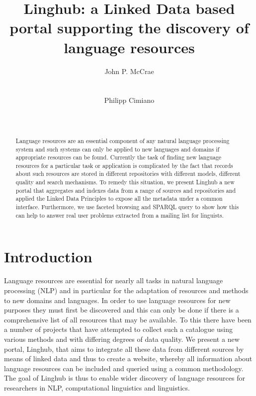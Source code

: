 \documentclass{acm_proc_article-sp}
\begin{document}
\title{Linghub: a Linked Data based portal supporting the discovery of language
resources}

\author{
\alignauthor
John P. McCrae\\
       \\
       \\
\alignauthor
Philipp Cimiano\\
       \\
       \\
   }

\maketitle
\begin{abstract}
    Language resources are an essential component of any natural language
    processing system and such systems can only be applied to new languages and
    domains if appropriate resources can be found. Currently the task of finding
    new language resources for a particular task or application is complicated by the fact that records about such
    resources are
    stored in different repositories with different models, different quality
    and search mechanisms. To remedy this situation, we present Linghub a new
    portal that aggregates and indexes data
    from a range of sources and repositories and applied the Linked Data
    Principles to expose all the metadata under a
    common interface. Furthermore, we use faceted browsing and SPARQL query to
    show how this can help to answer real user problems extracted from a mailing
    list for linguists.
\end{abstract}

\section{Introduction}

Language resources are essential for nearly all tasks in natural language
processing (NLP) and in particular
for the adaptation of resources and methods to new domains and languages. In
order to use language resources for new purposes they must first be discovered
and this can only be done if there is a comprehensive list of all resources that
may be available. To this there have been a number of projects that have
attempted to collect such a catalogue using various methods and with differing
degrees of data quality. We present a new portal, Linghub, that aims to integrate all
these data from different sources by means of linked data and thus to create a
website, whereby all information about language resources can be included and
queried using a common methodology. The goal of Linghub is thus to enable wider
discovery of language resources for researchers in NLP, computational
linguistics and linguistics.
\end{document}
